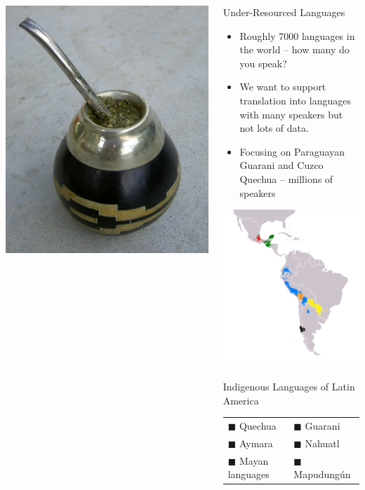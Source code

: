 \documentclass[final]{beamer}
\begin{document}
\begin{frame}{}
\begin{columns}[t]
\begin{column}{.32\linewidth}
  \centering
  \includegraphics[width=.3\linewidth]{guampa_mate.jpg}
  \end{column}

  \begin{column}{.32\linewidth}
  \vfill
  \begin{block}{\large Under-Resourced Languages}
    \begin{itemize}
    \item Roughly 7000 languages in the world -- how many do you speak?
    \item We want to support translation into languages with many speakers
    but not lots of data.
    \item Focusing on Paraguayan Guarani and Cuzco Quechua -- millions of
    speakers
    \end{itemize}
  \end{block}

  \centering
  \includegraphics[width=.50\linewidth]{Map-Most_Widely_Spoken_Native_Languages_in_Latin_America.png}
  \begin{block}{\large Indigenous Languages of Latin America}
    \begin{tabular}{ll}
      {\color{blue}        $\blacksquare$} Quechua &
      {\color{yellow}      $\blacksquare$} Guarani \\
      {\color{orange}      $\blacksquare$} Aymara &
      {\color{red}         $\blacksquare$} Nahuatl \\
      {\color{htmlgreen}   $\blacksquare$} Mayan languages &
      {\color{black}       $\blacksquare$} Mapudungún \\
    \end{tabular}
  \end{block}


\end{column}
\end{columns}
\end{frame}
\end{document}

